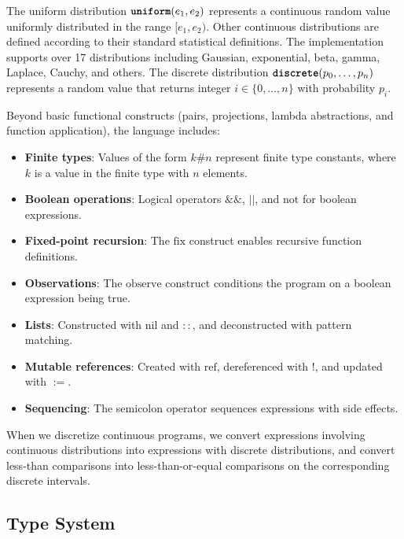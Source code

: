 \documentclass[acmsmall,screen,dvipsnames,x11names,nonacm,anonymous,review]{acmart}
\begin{document}
The uniform distribution $\text{\ttfamily\bfseries uniform}(e_1, e_2)$ represents a continuous random value uniformly distributed in the range $[e_1, e_2)$. Other continuous distributions are defined according to their standard statistical definitions. The implementation supports over 17 distributions including Gaussian, exponential, beta, gamma, Laplace, Cauchy, and others. The discrete distribution $\text{\ttfamily\bfseries discrete}(p_0, \ldots, p_{n})$ represents a random value that returns integer $i \in \{0, \ldots, n\}$ with probability $p_i$.

Beyond basic functional constructs (pairs, projections, lambda abstractions, and function application), the language includes:
\begin{itemize}
\item \textbf{Finite types}: Values of the form $k\#n$ represent finite type constants, where $k$ is a value in the finite type with $n$ elements.
\item \textbf{Boolean operations}: Logical operators $\&\&$, $||$, and $\text{not}$ for boolean expressions.
\item \textbf{Fixed-point recursion}: The $\text{fix}$ construct enables recursive function definitions.
\item \textbf{Observations}: The $\text{observe}$ construct conditions the program on a boolean expression being true.
\item \textbf{Lists}: Constructed with $\text{nil}$ and $::$, and deconstructed with pattern matching.
\item \textbf{Mutable references}: Created with $\text{ref}$, dereferenced with $!$, and updated with $:=$.
\item \textbf{Sequencing}: The semicolon operator sequences expressions with side effects.
\end{itemize}

When we discretize continuous programs, we convert expressions involving continuous distributions into expressions with discrete distributions, and convert less-than comparisons into less-than-or-equal comparisons on the corresponding discrete intervals.

\subsection{Type System}\label{sec:type-system}
\end{document}
